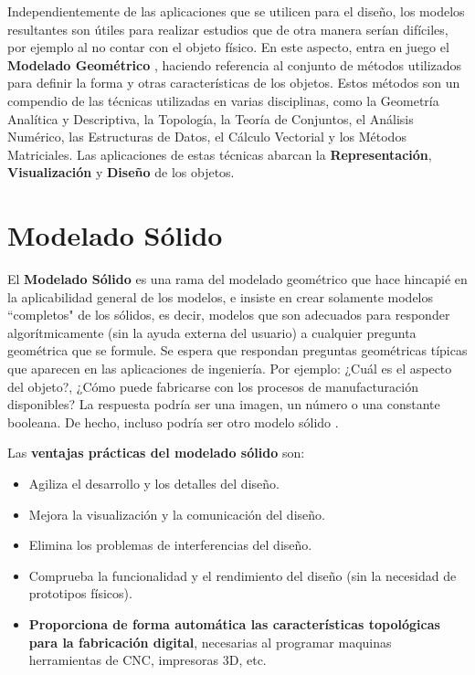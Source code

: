 Independientemente de las aplicaciones que se utilicen para el diseño, los modelos resultantes son útiles para realizar estudios que de otra manera serían difíciles, por ejemplo al no contar con el objeto físico. En este aspecto, entra en juego el \textbf{Modelado Geométrico}  \citep{Ramos2011}, haciendo referencia al conjunto de métodos utilizados para definir la forma y otras características de los objetos. Estos métodos son un compendio de las técnicas utilizadas en varias disciplinas, como la Geometría Analítica y Descriptiva, la Topología, la Teoría de Conjuntos, el Análisis Numérico, las Estructuras de Datos, el Cálculo Vectorial y los Métodos Matriciales. Las aplicaciones de estas técnicas abarcan la \textbf{Representación}, \textbf{Visualización} y \textbf{Diseño} de los objetos.




\section{Modelado Sólido}
\label{ref:modelado-solido}
 El \textbf{Modelado Sólido} \citep{Foley-ITC-1990} es una rama del modelado geométrico que  hace hincapié en la aplicabilidad general de los modelos, e insiste en crear solamente modelos ``completos" de los sólidos, es decir, modelos que son adecuados para responder algorítmicamente (sin la ayuda externa del usuario) a cualquier pregunta geométrica que se formule. Se espera que respondan preguntas geométricas típicas que aparecen en las aplicaciones de ingeniería. Por ejemplo:
¿Cuál es el aspecto del objeto?, ¿Cómo puede fabricarse con los procesos de manufacturación disponibles? 
La respuesta podría ser una imagen, un número o una constante booleana. De hecho, incluso podría ser otro modelo sólido \citep{Ramos2011}. 


\vspace{5mm}
Las \textbf{ventajas prácticas del modelado sólido} son:
\begin{itemize}
    \item Agiliza el desarrollo y los detalles del diseño.
    \item Mejora la visualización y la comunicación del diseño.
    \item Elimina los problemas de interferencias del diseño.
    \item Comprueba la funcionalidad y el rendimiento del diseño (sin la necesidad de prototipos físicos).
    \item \textbf{Proporciona de forma automática las características topológicas para la fabricación digital}, necesarias al programar maquinas herramientas de CNC, impresoras 3D, etc.
\end{itemize}



